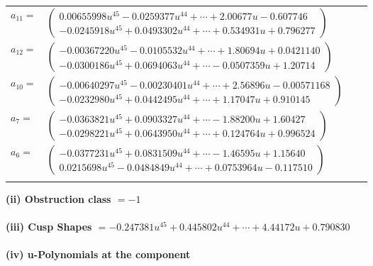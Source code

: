 \documentclass[1p]{elsarticle_modified}
\theoremstyle{definition}
\begin{document}
\begin{tabular}{m{7pt} m{180pt} m{7pt} m{180pt} }
\flushright $a_{11}=$&$\begin{pmatrix}0.00655998 u^{45}-0.0259377 u^{44}+\cdots+2.00677 u-0.607746\\-0.0245918 u^{45}+0.0493302 u^{44}+\cdots+0.534931 u+0.796277\end{pmatrix}$ \\
\flushright $a_{12}=$&$\begin{pmatrix}-0.00367220 u^{45}-0.0105532 u^{44}+\cdots+1.80694 u+0.0421140\\-0.0300186 u^{45}+0.0694063 u^{44}+\cdots-0.0507359 u+1.20714\end{pmatrix}$ \\
\flushright $a_{10}=$&$\begin{pmatrix}-0.00640297 u^{45}-0.00230401 u^{44}+\cdots+2.56896 u-0.00571168\\-0.0232980 u^{45}+0.0442495 u^{44}+\cdots+1.17047 u+0.910145\end{pmatrix}$ \\
\flushright $a_{7}=$&$\begin{pmatrix}-0.0363821 u^{45}+0.0903327 u^{44}+\cdots-1.88200 u+1.60427\\-0.0298221 u^{45}+0.0643950 u^{44}+\cdots+0.124764 u+0.996524\end{pmatrix}$ \\
\flushright $a_{6}=$&$\begin{pmatrix}-0.0377231 u^{45}+0.0831509 u^{44}+\cdots-1.46595 u+1.15640\\0.0215698 u^{45}-0.0484849 u^{44}+\cdots+0.0753964 u-0.117510\end{pmatrix}$\\&\end{tabular}
\flushleft \textbf{(ii) Obstruction class $= -1$}\\~\\
\flushleft \textbf{(iii) Cusp Shapes $= -0.247381 u^{45}+0.445802 u^{44}+\cdots+4.44172 u+0.790830$}\\~\\
\newpage\renewcommand{\arraystretch}{1}
\flushleft \textbf{(iv) u-Polynomials at the component}\newline \\
\end{document}
